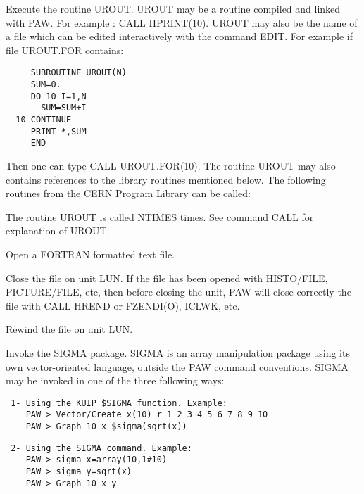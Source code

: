 \BEGARG
{}
\ENDARG
\BEGTEXT
Execute the routine UROUT.
UROUT may be a routine compiled and linked with PAW.
For example : CALL HPRINT(10).
UROUT may also be the name of a file which can be edited interactively
with the command EDIT. For example if file UROUT.FOR contains:
\begin{verbatim}
     SUBROUTINE UROUT(N)
     SUM=0.
     DO 10 I=1,N
       SUM=SUM+I
  10 CONTINUE
     PRINT *,SUM
     END
\end{verbatim}
Then one can type CALL UROUT.FOR(10).  The routine UROUT may also
contains references to the library routines mentioned below.
The following routines from the CERN Program Library can be called:
\ENDTEXT

\BEGARG
{}
\ENDARG
\BEGTEXT
The routine UROUT is called NTIMES times.
See command CALL for explanation of UROUT.
\ENDTEXT

\BEGARG
{}
\ENDARG
\BEGTEXT
Open a FORTRAN formatted text file.
\ENDTEXT

\BEGARG
{}
\ENDARG
\BEGTEXT
Close the file on unit LUN.
If the file has been opened with HISTO/FILE, PICTURE/FILE, etc, then
before closing the unit, PAW will close correctly the file with
CALL HREND or FZENDI(O), ICLWK, etc.
\ENDTEXT

\BEGARG
{}
\ENDARG
\BEGTEXT
Rewind the file on unit LUN.
\ENDTEXT

\BEGTEXT
Invoke the SIGMA package.
SIGMA is an array manipulation package using its own
vector-oriented language, outside the PAW command conventions.
SIGMA may be invoked in one of the three following ways:
\begin{verbatim}
 1- Using the KUIP $SIGMA function. Example:
    PAW > Vector/Create x(10) r 1 2 3 4 5 6 7 8 9 10
    PAW > Graph 10 x $sigma(sqrt(x))
\end{verbatim}

\begin{verbatim}
 2- Using the SIGMA command. Example:
    PAW > sigma x=array(10,1#10)
    PAW > sigma y=sqrt(x)
    PAW > Graph 10 x y
\end{verbatim}

